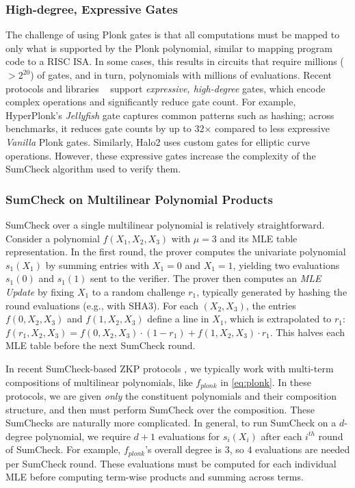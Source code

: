 \subsubsection{\textbf{High-degree, Expressive Gates}}
The challenge of using Plonk gates is that all computations must be mapped to only what is supported by the Plonk polynomial, 
similar to mapping program code to a RISC ISA.
In some cases, this results in circuits that require millions ($>2^{20}$) of gates, and in turn, polynomials with millions of evaluations.
Recent protocols and libraries ~\cite{halo2, hyperplonk} support \textit{expressive, high-degree} gates, which encode complex operations and significantly reduce gate count.
For example, HyperPlonk’s \textit{Jellyfish} gate captures common patterns such as hashing; across benchmarks, it reduces gate counts by up to 32× compared to less expressive \textit{Vanilla} Plonk gates.
Similarly, Halo2 uses custom gates for elliptic curve operations. However, these expressive gates increase the complexity of the SumCheck algorithm used to verify them.



\subsubsection{\textbf{SumCheck on Multilinear Polynomial Products}}
SumCheck over a single multilinear polynomial is relatively straightforward.
Consider a polynomial $f(X_1, X_2, X_3)$ with $\mu = 3$ and its MLE table representation.
In the first round, the prover computes the univariate polynomial $s_1(X_1)$ by summing entries with $X_1 = 0$ and $X_1 = 1$, yielding two evaluations $s_1(0)$ and $s_1(1)$ sent to the verifier.
The prover then computes an \textit{MLE Update} by fixing $X_1$ to a random challenge $r_1$, typically generated by hashing the round evaluations (e.g., with SHA3).
For each $(X_2, X_3)$, the entries $f(0, X_2, X_3)$ and $f(1, X_2, X_3)$ define a line
in $X_1$, which is extrapolated to $r_1$: $f(r_1,X_2, X_3) = f(0, X_2, X_3)\cdot(1-r_1) + f(1, X_2, X_3)\cdot r_1$.
This halves each MLE table before the next SumCheck round.

In recent SumCheck-based ZKP protocols \cite{spartan, orion, hyperplonk, jolt}, we typically work with multi-term compositions of multilinear polynomials, like $f_{plonk}$ in \autoref{eq:plonk}. In these protocols, we are given \textit{only} the constituent polynomials and their composition structure, and then must perform SumCheck over the composition. These SumChecks are naturally more complicated.
In general, to run SumCheck on a $d$-degree polynomial, we require $d+1$ evaluations for $s_i(X_i)$ after each $i^{th}$ round of SumCheck.
For example, $f_{plonk}$'s overall degree is $3$, so \textit{$4$} evaluations are needed per SumCheck round.
These evaluations must be computed for each individual MLE before computing term-wise products and summing across terms.

